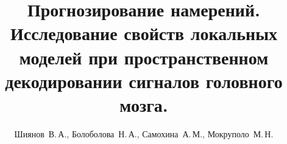 \documentclass[12pt,twoside]{article}
\title
    [Прогнозирование намерений]
    {Прогнозирование намерений. Исследование свойств локальных моделей при пространственном декодировании сигналов головного мозга.}
\author
    [Болоболова~Н.\,А.]
    {Шиянов~В.\,А., Болоболова~Н.\,А., Самохина~А.\,М., Мокруполо~М.\,Н.}
\begin{document}
\maketitle
\bigskip
\bigskip
\bigskip
\bigskip
\bigskip
\maketitleSecondary
\end{document}
